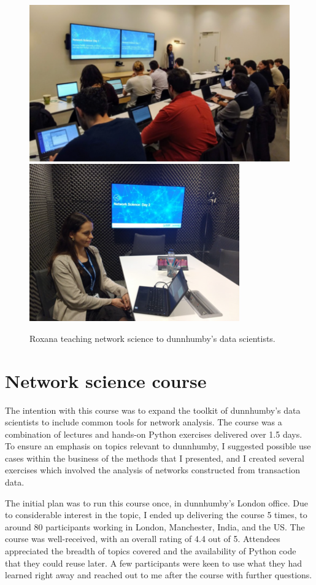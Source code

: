 \documentclass[a4paper, 10pt, english, oneside]{extarticle}
\begin{document}
\begin{figure}[htb]
\centering
\includegraphics[height=0.17\paperheight]{classroom}
\hfill 
\includegraphics[height=0.17\paperheight]{roxana_laptop}
\caption*{Roxana teaching network science to dunnhumby’s data scientists.}
\end{figure}

\section*{Network science course}

The intention with this course was to expand the toolkit of dunnhumby's data scientists to include common tools for network analysis. The course was a combination of lectures and hands-on Python exercises delivered over 1.5 days. To ensure an emphasis on topics relevant to dunnhumby, I suggested possible use cases within the business of the methods that I presented, and I created several exercises which involved the analysis of networks constructed from transaction data.

The initial plan was to run this course once, in dunnhumby's London office. Due to considerable interest in the topic, I ended up delivering the course 5 times, to around 80 participants working in London, Manchester, India, and the US. The course was well-received, with an overall rating of 4.4 out of 5. Attendees appreciated the breadth of topics covered and the availability of Python code that they could reuse later. A few participants were keen to use what they had learned right away and reached out to me after the course with further questions.
\end{document}

